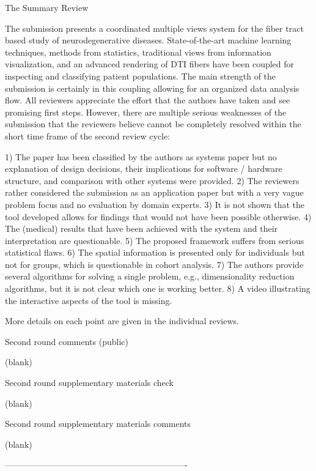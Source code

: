   The Summary Review

    The submission presents a coordinated multiple views system for the fiber tract
    based study of neurodegenerative diseases. State-of-the-art machine learning
    techniques, methods from statistics, traditional views from information
    visualization, and an advanced rendering of DTI fibers have been coupled for
    inspecting and classifying patient populations. The main strength of the
    submission is certainly in this coupling allowing for an organized data analysis
    flow. All reviewers appreciate the effort that the authors have taken and see
    promising first steps. However, there are multiple serious weaknesses of the
    submission that the reviewers believe cannot be completely resolved within the
    short time frame of the second review cycle:

    1) The paper has been classified by the authors as systems paper but no
    explanation of design decisions, their implications for software / hardware
    structure, and comparison with other systems were provided.
    2) The reviewers rather considered the submission as an application paper but with
    a very vague problem focus and no evaluation by domain experts.
    3) It is not shown that the tool developed allows for findings that would not have
    been possible otherwise.
    4) The (medical) results that have been achieved with the system and their
    interpretation are questionable.
    5) The proposed framework suffers from serious statistical flaws.
    6) The spatial information is presented only for individuals but not for groups,
    which is questionable in cohort analysis.
    7) The authors provide several algorithms for solving a single problem, e.g.,
    dimensionality reduction algorithms, but it is not clear which one is working
    better.
    8) A video illustrating the interactive aspects of the tool is missing.

    More details on each point are given in the individual reviews.

  Second round comments (public)

    (blank)

  Second round supplementary materials check

    (blank)

  Second round supplementary materials comments

    (blank)

----------------------------------------------------------------

